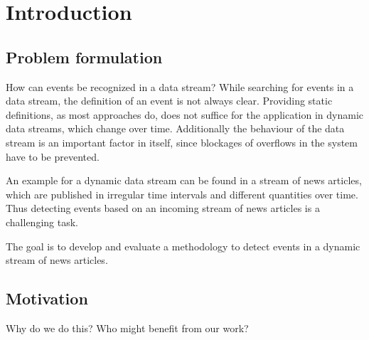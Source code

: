 \section{Introduction}

\subsection{Problem formulation}




How can events be recognized in a data stream? While searching for events in a data stream, the definition of an event is not always clear. Providing static definitions, as most approaches do, does not suffice for the application in dynamic data streams, which change over time. Additionally the behaviour of the data stream is an important factor in itself, since blockages of overflows in the system have to be prevented.

An example for a dynamic data stream can be found in a stream of news articles, which are published in irregular time intervals and different quantities over time. Thus detecting events based on an incoming stream of news articles is a challenging task. 

The goal is to develop and evaluate a methodology to detect events in a dynamic stream of news articles.

\subsection{Motivation}

Why do we do this?
Who might benefit from our work?
